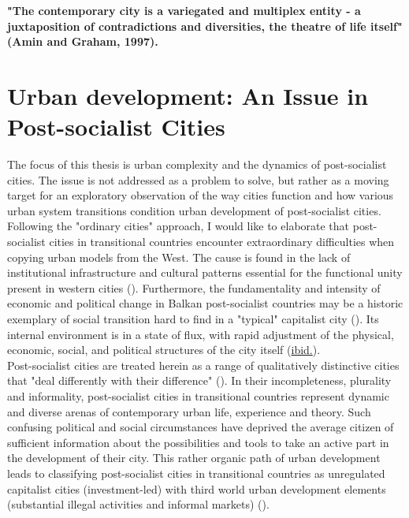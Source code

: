 \documentclass[11pt]{report}
\begin{document}
{\textbf{"The contemporary city is a variegated and multiplex entity - a juxtaposition of contradictions and diversities, the theatre of life itself" (Amin and Graham, 1997).}

\section{Urban development: An Issue in Post-socialist Cities}

The focus of this thesis is urban complexity and the dynamics of post-socialist cities. The issue is not addressed as a problem to solve, but rather as a moving target for an exploratory observation of the way cities function and how various urban system transitions condition urban development of post-socialist cities.
\\

Following the "ordinary cities" approach, I would like to elaborate that post-socialist cities in transitional countries encounter extraordinary  difficulties  when  copying  urban  models from the West.
The cause is found in the lack of institutional infrastructure and cultural patterns essential for the functional unity present in western cities (\citealt{petrovic_cities_2009}). Furthermore, the fundamentality and intensity of economic and political change in Balkan post-socialist countries may be a historic exemplary of social transition hard to find in a "typical" capitalist city (\citealt{sykora_transitional_1999}). Its internal environment is in a state of flux, with rapid adjustment of the physical, economic, social, and political structures of the city itself (\href{ref}{ibid.}).
\\

Post-socialist cities are treated herein as a range of qualitatively distinctive cities that "deal differently with their difference" ({\citealt{amin_ordinary_1997}). In their incompleteness, plurality and informality, post-socialist cities in transitional countries represent dynamic and diverse arenas of contemporary urban life, experience and theory. Such confusing political and social circumstances have deprived the average citizen of sufficient information about the possibilities and tools to take an active part in the development of their city. 
This rather organic path of urban development leads to classifying post-socialist cities in transitional countries as unregulated capitalist cities (investment-led) with third world urban development elements (substantial illegal activities and informal markets) (\href{ref}{\citealt{petrovic_cities_2009}}).
\\

}}
\end{document}

